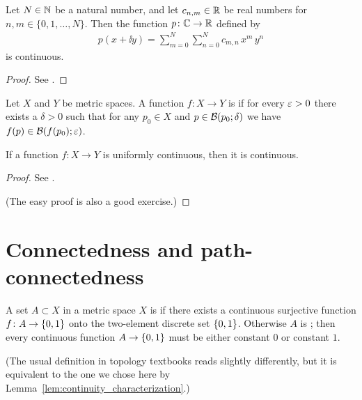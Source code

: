 \begin{corollary}
  \label{cor:multivariate_polynomial_continuous}
  Let $N \in \mathbb{N}$ be a natural number, and let
  $c_{n,m} \in \mathbb{R}$ be real numbers for $n,m \in \{0,1,\ldots,N\}$.
  Then the function $p \colon \mathbb{C} \to \mathbb{R}$ defined by
  \begin{align*}
    p(x + \ii y) = \sum_{m=0}^N \sum_{n=0}^N c_{m,n} \, x^m \, y^n
  \end{align*}
  is continuous.
\end{corollary}
\begin{proof}
  See \MetSpCourse{}.
\end{proof}

\begin{definition}
  \label{def:uniformly_continuous}
  Let $X$ and $Y$ be metric spaces.
  A function $f \colon X \to Y$ is  if
  for every $\varepsilon > 0$ there exists a $\delta > 0$ such that for
  any $p_0 \in X$ and $p \in \mathcal{B}(p_0; \delta)$
  we have $f(p) \in \mathcal{B}(f(p_0); \varepsilon)$.
\end{definition}

\begin{lemma}
  \label{lem:uniformly_continuous_implies_continuous}
  If a function $f \colon X \to Y$ is uniformly continuous, then it is continuous.
\end{lemma}
\begin{proof}
  See \MetSpCourse{}.

  (The easy proof is also a good exercise.)
\end{proof}


\section{Connectedness and path-connectedness}

\begin{definition}[Connectedness]
  \label{def:connected}
  A set $A \subset X$ in a metric space $X$
  is  if there exists
  a continuous surjective function
  $f \colon A \to \left\{ 0,1 \right\}$ onto the two-element discrete
  set $\left\{ 0,1 \right\}$.
  Otherwise $A$ is ;
  then every continuous function $A \to \left\{ 0,1 \right\}$ must be
  either constant $0$ or constant $1$.

  (The usual definition in topology textbooks reads
  slightly differently, but it is
  equivalent to the one we chose here by
  Lemma~\ref{lem:continuity_characterization}.)
\end{definition}

